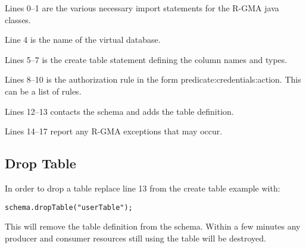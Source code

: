 Lines 0--1 are the various necessary import statements for the R-GMA
java classes.

Line 4 is the name of the virtual database.

Lines 5--7 is the create table statement defining the column names and
types.

Lines 8--10 is the authorization rule in the form
predicate:credentials:action. This can be a list of rules.

Lines 12--13 contacts the schema and adds the table definition.

Lines 14--17 report any R-GMA exceptions that may occur.



\subsection {Drop Table}
\label{sec:dropTable}

In order to drop a table replace line 13 from the create table example
with:
\begin{verbatim}
schema.dropTable("userTable");
\end{verbatim}
This will remove the table definition from the schema. Within a few
minutes any producer and consumer resources still using the table will
be destroyed.
